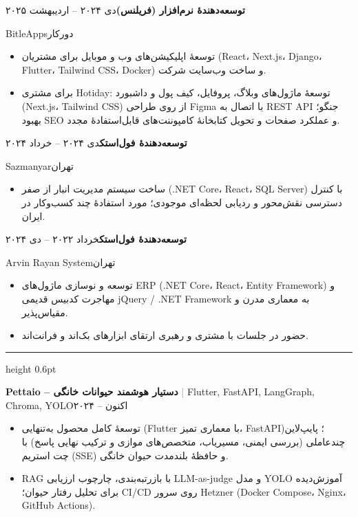 \documentclass[10pt,a4paper]{article}
\newcommand{\en}[1]{\textenglish{#1}}
\renewcommand{\section}[1]{%
  \vspace{6pt}{\bfseries\color{accent}#1}\par\nointerlineskip\vspace{1.5pt}%
  {\color{accent}\hrule height 0.6pt}\vspace{3pt}}
\newcommand{\entry}[4]{%
  \vspace{3pt}\textbf{#1}\hfill #3\par
  #2\hfill #4\par\vspace{1pt}}
\newcommand{\project}[3]{%
  \vspace{3pt}\textbf{#1} \textcolor{gray}{|} {\small #2}\hfill #3\par\vspace{1pt}}
\begin{document}
\entry{توسعه‌دهندهٔ نرم‌افزار (فریلنس)}{\en{BitleApps}}{دی ۲۰۲۴ – اردیبهشت ۲۰۲۵}{دورکار}
\begin{itemize}
  \item توسعهٔ اپلیکیشن‌های وب و موبایل برای مشتریان (\en{React}، \en{Next.js}، \en{Django}، \en{Flutter}، \en{Tailwind CSS}، \en{Docker}) و ساخت وب‌سایت شرکت.
  \item برای مشتری \en{Hotiday}: توسعهٔ ماژول‌های وبلاگ، پروفایل، کیف پول و داشبورد (\en{Next.js}، \en{Tailwind CSS}) از روی طراحی
        \en{Figma} با اتصال به \en{REST API} جنگو؛ بهبود \en{SEO} و عملکرد صفحات و تحویل کتابخانهٔ کامپوننت‌های قابل‌استفادهٔ مجدد.
\end{itemize}

\entry{توسعه‌دهندهٔ فول‌استک}{\en{Sazmanyar}}{دی ۲۰۲۴ – خرداد ۲۰۲۴}{تهران}
\begin{itemize}
  \item ساخت سیستم مدیریت انبار از صفر (\en{.NET Core}، \en{React}، \en{SQL Server}) با کنترل دسترسی نقش‌محور و ردیابی لحظه‌ای
        موجودی؛ مورد استفادهٔ چند کسب‌وکار در ایران.
\end{itemize}

\entry{توسعه‌دهندهٔ فول‌استک}{\en{Arvin Rayan System}}{خرداد ۲۰۲۲ – دی ۲۰۲۴}{تهران}
\begin{itemize}
  \item توسعه و نوسازی ماژول‌های \en{ERP} (\en{.NET Core}، \en{React}، \en{Entity Framework}) و مهاجرت کدبیس قدیمی
        \en{jQuery / .NET Framework} به معماری مدرن و مقیاس‌پذیر.
  \item حضور در جلسات با مشتری و رهبری ارتقای ابزارهای بک‌اند و فرانت‌اند.
\end{itemize}

\section{پروژه‌ها}

\project{\en{Pettaio} – دستیار هوشمند حیوانات خانگی}{\en{Flutter, FastAPI, LangGraph, Chroma, YOLO}}{۲۰۲۴ – اکنون}
\begin{itemize}
  \item توسعهٔ کامل محصول به‌تنهایی (\en{Flutter} با معماری تمیز، \en{FastAPI})؛ پایپ‌لاین چندعاملی (بررسی ایمنی، مسیریاب،
        متخصص‌های موازی و ترکیب نهایی پاسخ) با چت استریم (\en{SSE}) و حافظهٔ بلندمدت حیوان خانگی.
  \item \en{RAG} با بازرتبه‌بندی، چارچوب ارزیابی \en{LLM-as-judge} و مدل \en{YOLO} آموزش‌دیده برای تحلیل رفتار حیوان؛
        \en{CI/CD} روی سرور \en{Hetzner} (\en{Docker Compose}، \en{Nginx}، \en{GitHub Actions}).
\end{itemize}
\end{document}
